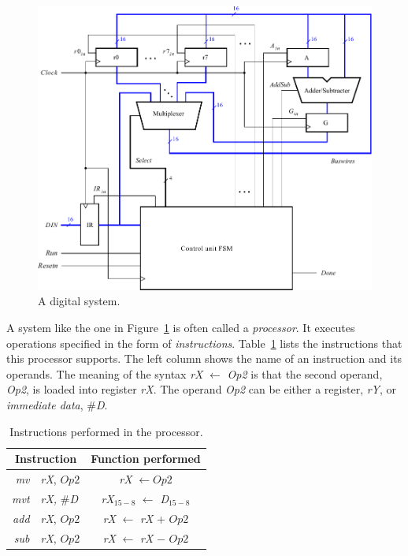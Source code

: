 \documentclass[epsfig,10pt,fullpage]{article}
\begin{document}
\begin{figure}[H]
	\begin{center}
		\includegraphics[scale = 0.8]{figures/figure1.pdf}
	\end{center}
	\caption{A digital system.}
	\label{fig:fig1}
\end{figure}

\newpage
\noindent
A system like the one in Figure~\ref{fig:fig1} is often called a {\it processor}. It 
executes operations specified in the 
form of {\it instructions}. Table~\ref{tab:instructions} lists the instructions that this 
processor supports. The left column shows the name of an instruction and its operands. 
The meaning of the syntax {\it rX} $\leftarrow$ {\it Op2} is that the second operand,
{\it Op2}, is loaded into register {\it rX}. The operand {\it Op2} can be either a
register, {\it rY}, or {\it immediate data}, \#{\it D}.

\begin{table}[H]
\begin{center}
\begin{tabular}{rl|c}
   \multicolumn{2}{c|}{Instruction} & Function performed \\ \hline 
   \rule[0.01in]{0in}{0.15in}{\it mv} & {\it rX}, $Op2$ & {\it rX} $\leftarrow Op2$ \\ 
		  \rule[-0.075in]{0in}{0.2in}{\it mvt} & {\it rX,} \#{\it D} & {\it rX$_{15-8}$} $\leftarrow$ {\it D$_{15-8}$}\\ 
   \rule[-0.075in]{0in}{0.2in}{\it add} & {\it rX}, $Op2$ & {\it rX} $\leftarrow$ {\it rX} + $Op2$ \\ 
   \rule[-0.075in]{0in}{0.2in}{\it sub} & {\it rX}, $Op2$ & {\it rX} $\leftarrow$ {\it rX} $-$ $Op2$ \\ 
\end{tabular}
\caption{Instructions performed in the processor.}
\label{tab:instructions}
\end{center}
\end{table}
\end{document}
